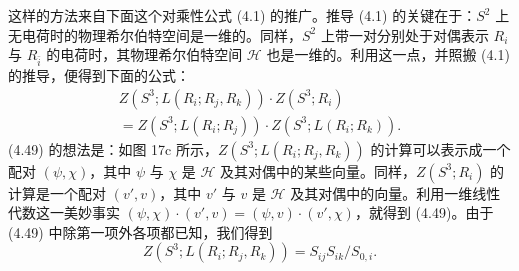 \documentclass[11pt,a4paper]{article}
\begin{document}
这样的方法来自下面这个对乘性公式 (4.1) 的推广。推导 (4.1) 的关键在于：$S^2$ 上无电荷时的物理希尔伯特空间是一维的。同样，$S^2$ 上带一对分别处于对偶表示 $R_i$ 与 $R_{\bar i}$ 的电荷时，其物理希尔伯特空间 $\mathcal{H}$ 也是一维的。利用这一点，并照搬 (4.1) 的推导，便得到下面的公式：
\begin{equation}
\begin{gathered}
    Z(S^3;L(R_i;R_j,R_k))\cdot Z(S^3;R_i)\\
    = Z(S^3;L(R_i;R_j))\cdot Z(S^3;L(R_i;R_k)).
\end{gathered}
\tag{4.49}
\end{equation}
(4.49) 的想法是：如图 17c 所示，$Z(S^3;L(R_i;R_j,R_k))$ 的计算可以表示成一个配对 $(\psi,\chi)$，其中 $\psi$ 与 $\chi$ 是 $\mathcal{H}$ 及其对偶中的某些向量。同样，$Z(S^3;R_i)$ 的计算是一个配对 $(v',v)$，其中 $v'$ 与 $v$ 是 $\mathcal{H}$ 及其对偶中的向量。利用一维线性代数这一美妙事实 $(\psi,\chi)\cdot(v',v)=(\psi,v)\cdot(v',\chi)$，就得到 (4.49)。由于 (4.49) 中除第一项外各项都已知，我们得到
\begin{equation}
    Z(S^3;L(R_i;R_j,R_k)) = S_{ij}S_{ik}/S_{0,i}. \tag{4.50}
\end{equation}
\end{document}
